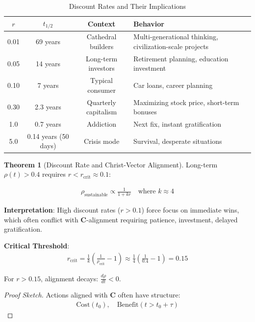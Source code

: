 \documentclass[11pt,a4paper]{article}
\theoremstyle{definition}
\newtheorem{theorem}{Theorem}[section]
\theoremstyle{remark}
\begin{document}
\begin{small}
\begin{enumerate}
\begin{table}[H]
\centering
\caption{Discount Rates and Their Implications}
\label{tab:discount_rates}
\begin{tabular}{|c|c|c|p{6cm}|}
\hline
\textbf{\(r\)} & \textbf{\(t_{1/2}\)} & \textbf{Context} & \textbf{Behavior} \\
\hline
0.01 & 69 years & Cathedral builders & Multi-generational thinking, civilization-scale projects \\
\hline
0.05 & 14 years & Long-term investors & Retirement planning, education investment \\
\hline
0.10 & 7 years & Typical consumer & Car loans, career planning \\
\hline
0.30 & 2.3 years & Quarterly capitalism & Maximizing stock price, short-term bonuses \\
\hline
1.0 & 0.7 years & Addiction & Next fix, instant gratification \\
\hline
5.0 & 0.14 years (50 days) & Crisis mode & Survival, desperate situations \\
\hline
\end{tabular}
\end{table}

\begin{theorem}[Discount Rate and Christ-Vector Alignment]
Long-term \(\rho(t) > 0.4\) requires \(r < r_{\text{crit}} \approx 0.1\):

\begin{align}
\rho_{\text{sustainable}} \propto \frac{1}{1 + kr} \quad \text{where } k \approx 4
\end{align}

\textbf{Interpretation}: High discount rates (\(r > 0.1\)) force focus on immediate wins, which often conflict with \(\mathbf{C}\)-alignment requiring patience, investment, delayed gratification.

\textbf{Critical Threshold}:
\begin{align}
r_{\text{crit}} = \frac{1}{k}(\frac{1}{\rho_{\text{crit}}} - 1) \approx \frac{1}{4}(\frac{1}{0.4} - 1) = 0.15
\end{align}

For \(r > 0.15\), alignment decays: \(\frac{d\rho}{dt} < 0\).
\end{theorem}

\begin{proof}[Proof Sketch]
Actions aligned with \(\mathbf{C}\) often have structure:
\begin{align}
\text{Cost}(t_0), \quad \text{Benefit}(t > t_0 + \tau)
\end{align}


\end{proof}
\end{enumerate}
\end{small}
\end{document}
